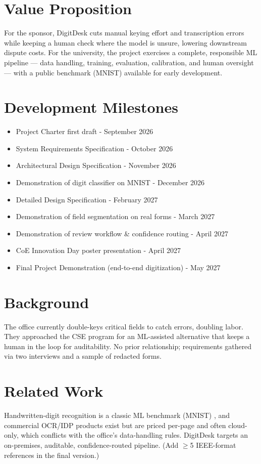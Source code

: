 \documentclass[11pt,letterpaper]{article}
\begin{document}
\section{Value Proposition}
For the sponsor, DigitDesk cuts manual keying effort and transcription errors while
keeping a human check where the model is unsure, lowering downstream dispute costs.
For the university, the project exercises a complete, responsible ML pipeline ---
data handling, training, evaluation, calibration, and human oversight --- with a
public benchmark (MNIST) available for early development.

\section{Development Milestones}
\begin{itemize}
  \item Project Charter first draft - September 2026
  \item System Requirements Specification - October 2026
  \item Architectural Design Specification - November 2026
  \item Demonstration of digit classifier on MNIST - December 2026
  \item Detailed Design Specification - February 2027
  \item Demonstration of field segmentation on real forms - March 2027
  \item Demonstration of review workflow \& confidence routing - April 2027
  \item CoE Innovation Day poster presentation - April 2027
  \item Final Project Demonstration (end-to-end digitization) - May 2027
\end{itemize}
\newpage

\section{Background}
The office currently double-keys critical fields to catch errors, doubling labor.
They approached the CSE program for an ML-assisted alternative that keeps a human in
the loop for auditability. No prior relationship; requirements gathered via two
interviews and a sample of redacted forms.

\section{Related Work}
Handwritten-digit recognition is a classic ML benchmark (MNIST) \cite{Rubin2012},
and commercial OCR/IDP products exist but are priced per-page and often cloud-only,
which conflicts with the office's data-handling rules. DigitDesk targets an
on-premises, auditable, confidence-routed pipeline. (Add $\geq$5 IEEE-format
references in the final version.)
\end{document}
